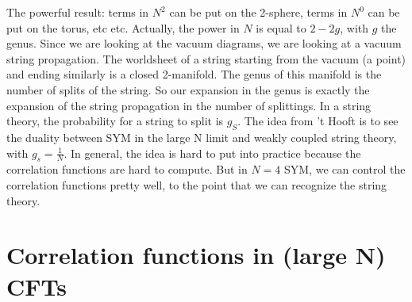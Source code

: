 \documentclass[a4paper]{book}
\theoremstyle{definition}
\theoremstyle{remark}
\begin{document}
The powerful result: terms in $N^2$ can be put on the 2-sphere, terms in $N^0$ can be put on the torus, etc etc. Actually, the power in $N$ is equal to $2-2g$, with $g$ the genus. Since we are looking at the vacuum diagrams, we are looking at a vacuum string propagation. The worldsheet of a string starting from the vacuum (a point) and ending similarly is a closed 2-manifold. The genus of this manifold is the number of splits of the string. So our expansion in the genus is exactly the expansion of the string propagation in the number  of splittings. In a string theory, the probability for a string to split is $g_S$. The idea from 't Hooft is to see the duality between SYM in the large N limit and weakly coupled string theory, with $g_s = \frac{1}{N}$. In general, the idea is hard to put into practice because the correlation functions are hard to compute. But in $N=4$ SYM, we can control the correlation functions pretty well, to the point that we can recognize the string theory. 

\section{Correlation functions in (large N) CFTs}
\end{document}
